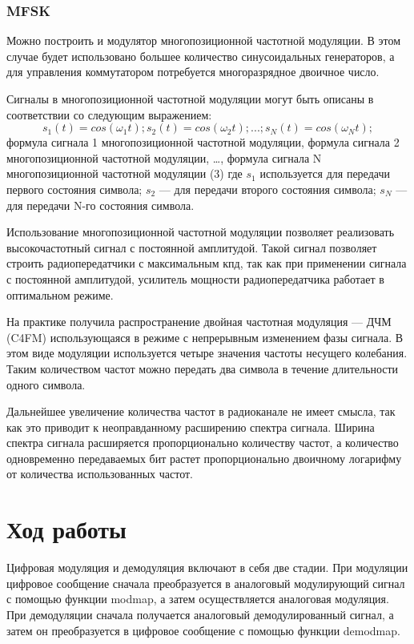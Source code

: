 \subsubsection{MFSK}
Можно построить и модулятор многопозиционной частотной модуляции. В этом случае будет использовано большее количество синусоидальных генераторов, а для управления коммутатором потребуется многоразрядное двоичное число.

Сигналы в многопозиционной частотной модуляции могут быть описаны в соответствии со следующим выражением:
\begin{equation}
	s_1 (t) =  cos(\omega_1 t); s_2 (t) =  cos(\omega_2 t); ...; s_N (t) =  cos(\omega_N t); 
\end{equation}
формула сигнала 1 многопозиционной частотной модуляции,  формула сигнала 2 многопозиционной частотной модуляции, …,  формула сигнала N многопозиционной частотной модуляции (3)
где $s_1$ используется для передачи первого состояния символа;
$s_2$ — для передачи второго состояния символа;
$s_N$ — для передачи N-го состояния символа.

Использование многопозиционной частотной модуляции позволяет реализовать высокочастотный сигнал с постоянной амплитудой. Такой сигнал позволяет строить радиопередатчики с максимальным кпд, так как при применении сигнала с постоянной амплитудой, усилитель мощности радиопередатчика работает в оптимальном режиме.

 На практике получила распространение двойная частотная модуляция — ДЧМ (C4FM) использующаяся в режиме с непрерывным изменением фазы сигнала. В этом виде модуляции используется четыре значения частоты несущего колебания. Таким количеством частот можно передать два символа в течение длительности одного символа.

Дальнейшее увеличение количества частот в радиоканале не имеет смысла, так как это приводит к неоправданному расширению спектра сигнала. Ширина спектра сигнала расширяется пропорционально количеству частот, а количество одновременно передаваемых бит растет пропорционально двоичному логарифму от количества использованных частот.


\section{Ход работы}
Цифровая модуляция и демодуляция включают в себя две стадии. При модуляции цифровое сообщение сначала преобразуется в аналоговый модулирующий сигнал с помощью функции modmap, а затем осуществляется аналоговая модуляция. При демодуляции сначала получается аналоговый демодулированный сигнал, а затем он преобразуется в цифровое сообщение с помощью функции demodmap.
 
